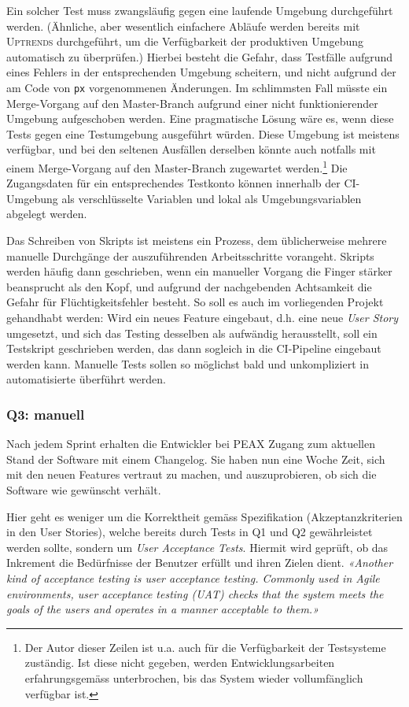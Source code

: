 Ein solcher Test muss zwangsläufig gegen eine laufende Umgebung durchgeführt werden. (Ähnliche, aber wesentlich einfachere Abläufe werden bereits mit \textsc{Uptrends} durchgeführt, um die Verfügbarkeit der produktiven Umgebung automatisch zu überprüfen.) Hierbei besteht die Gefahr, dass Testfälle aufgrund eines Fehlers in der entsprechenden Umgebung scheitern, und nicht aufgrund der am Code von \texttt{px} vorgenommenen Änderungen. Im schlimmsten Fall müsste ein Merge-Vorgang auf den Master-Branch aufgrund einer nicht funktionierender Umgebung aufgeschoben werden. Eine pragmatische Lösung wäre es, wenn diese Tests gegen eine Testumgebung ausgeführt würden. Diese Umgebung ist meistens verfügbar, und bei den seltenen Ausfällen derselben könnte auch notfalls mit einem Merge-Vorgang auf den Master-Branch zugewartet werden.\footnote{Der Autor dieser Zeilen ist u.a. auch für die Verfügbarkeit der Testsysteme zuständig. Ist diese nicht gegeben, werden Entwicklungsarbeiten erfahrungsgemäss unterbrochen, bis das System wieder vollumfänglich verfügbar ist.} Die Zugangsdaten für ein entsprechendes Testkonto können innerhalb der CI-Umgebung als verschlüsselte Variablen und lokal als Umgebungsvariablen abgelegt werden.

Das Schreiben von Skripts ist meistens ein Prozess, dem üblicherweise mehrere manuelle Durchgänge der auszuführenden Arbeitsschritte vorangeht. Skripts werden häufig dann geschrieben, wenn ein manueller Vorgang die Finger stärker beansprucht als den Kopf, und aufgrund der nachgebenden Achtsamkeit die Gefahr für Flüchtigkeitsfehler besteht. So soll es auch im vorliegenden Projekt gehandhabt werden: Wird ein neues Feature eingebaut, d.h. eine neue \textit{User Story} umgesetzt, und sich das Testing desselben als aufwändig herausstellt, soll ein Testskript geschrieben werden, das dann sogleich in die CI-Pipeline eingebaut werden kann. Manuelle Tests sollen so möglichst bald und unkompliziert in automatisierte überführt werden.

\subsubsection{Q3: manuell}

Nach jedem Sprint erhalten die Entwickler bei PEAX Zugang zum aktuellen Stand der Software mit einem Changelog. Sie haben nun eine Woche Zeit, sich mit den neuen Features vertraut zu machen, und auszuprobieren, ob sich die Software wie gewünscht verhält.

Hier geht es weniger um die Korrektheit gemäss Spezifikation (Akzeptanzkriterien in den User Stories), welche bereits durch Tests in Q1 und Q2 gewährleistet werden sollte, sondern um \textit{User Acceptance Tests}. Hiermit wird geprüft, ob das Inkrement die Bedürfnisse der Benutzer erfüllt und ihren Zielen dient. \textit{«Another kind of acceptance testing is \textit{user acceptance testing}. Commonly used in Agile environments, user acceptance testing (UAT) checks that the system meets the goals of the users and operates in a manner acceptable to them.»} \cite[S. 85]{testing}

